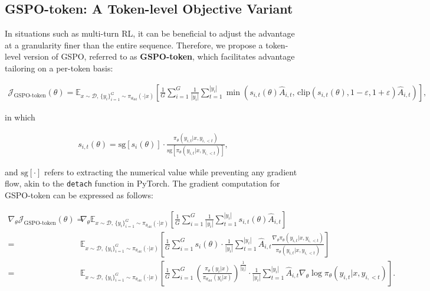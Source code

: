 \subsection{GSPO-token: A Token-level Objective Variant}

In situations such as multi-turn RL, it can be beneficial to adjust the advantage at a granularity finer than the entire sequence. Therefore, we propose a token-level version of GSPO, referred to as \textbf{GSPO-token}, which facilitates advantage tailoring on a per-token basis:

\begin{align}
\mathcal{J}_\text{GSPO-token}(\theta)
=
\mathbb{E}_{ x \sim \mathcal{D},\, \{y_i\}_{i=1}^G \sim \pi_{\theta_\text{old}}( \cdot | x) }
\left[ 
\frac{1}{G} \sum_{i=1}^{G} \frac{1}{|y_i|} \sum_{t=1}^{|y_i|} 
\min \left( s_{i,t}(\theta) \widehat{A}_{i,t},  \, \mathrm{clip} \left( s_{i,t}(\theta), 1 - {\varepsilon}, 1 + {\varepsilon} \right) \widehat{A}_{i,t} \right) 
\right],
\label{equ:gspo-token}
\end{align}

in which

\begin{align}
s_{i,t}(\theta) 
= \mathrm{sg} \left[ s_{i}(\theta) \right]  \cdot \frac{ \pi_{\theta} (y_{i,t} | x, y_{i,<t}) }{ \mathrm{sg} \left[ \pi_{\theta} (y_{i,t} | x, y_{i,<t}) \right] },
\end{align}

and $\mathrm{sg}[\cdot]$ refers to extracting the numerical value while preventing any gradient flow, akin to the \texttt{detach} function in PyTorch. The gradient computation for GSPO-token can be expressed as follows:

\begin{align}
\nabla_{\theta} \mathcal{J}_\text{GSPO-token}(\theta)
=&\ 
\nabla_{\theta} \mathbb{E}_{ x \sim \mathcal{D},\, \{y_i\}_{i=1}^G \sim \pi_{\theta_\text{old}}( \cdot | x) }
\left[ 
\frac{1}{G} \sum_{i=1}^{G}
\frac{1}{|y_i|} \sum_{t=1}^{|y_i|} 
s_{i,t}(\theta) \widehat{A}_{i,t}
\right] \\
=&\ 
\mathbb{E}_{ x \sim \mathcal{D},\, \{y_i\}_{i=1}^G \sim \pi_{\theta_\text{old}}( \cdot | x) }
\left[ 
\frac{1}{G} \sum_{i=1}^{G} s_i (\theta) \cdot \frac{1}{|y_i|} \sum_{t=1}^{|y_i|} 
\widehat{A}_{i,t} \frac{ \nabla_{\theta} \pi_{\theta} (y_{i,t} | x, y_{i,<t}) }{ \pi_{\theta} (y_{i,t} | x, y_{i,<t}) }
\right] \\
=&\ 
\mathbb{E}_{ x \sim \mathcal{D},\, \{y_i\}_{i=1}^G \sim \pi_{\theta_\text{old}}( \cdot | x) }
\left[ 
\frac{1}{G} \sum_{i=1}^{G}  \left( \frac{ \pi_{\theta} (y_i | x) }{ \pi_{\theta_\text{old}} (y_i | x)} \right)^{\frac{1}{|y_i|}}
\cdot \frac{1}{|y_i|} \sum_{t=1}^{|y_i|}
\widehat{A}_{i,t} \nabla_{\theta} \log \pi_{\theta} (y_{i,t} | x, y_{i,<t})  
\right].
\label{equ:gspo-token_grad}
\end{align}

